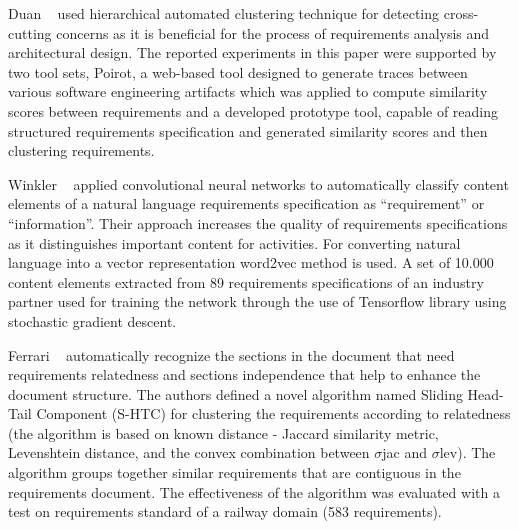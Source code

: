 Duan \etal~\cite{Duan:2007} used hierarchical automated clustering technique for
detecting cross-cutting concerns as it is beneficial for the process of
requirements analysis and architectural design. The reported experiments in this
paper were supported by two tool sets, Poirot, a web-based tool designed to
generate traces between various software engineering artifacts which was applied
to compute similarity scores between requirements and a developed prototype
tool, capable of reading structured requirements specification and generated
similarity scores and then clustering requirements.

Winkler \etal~\cite{Winkler:2016} applied convolutional neural networks to
automatically classify content elements of a natural language requirements
specification as “requirement” or “information”. Their approach increases the quality of requirements
specifications as it distinguishes important content for activities. For
converting natural language into a vector representation word2vec method is
used. A set of 10.000 content elements extracted from 89 requirements
specifications of an industry partner used for training the network through the
use of Tensorflow library using stochastic gradient descent.

 Ferrari \etal~\cite{Ferrari:2013} automatically recognize
the sections in the document that need requirements relatedness and sections
independence that help to enhance the document structure. The authors defined a
novel algorithm named Sliding Head-Tail Component (S-HTC) for clustering the
requirements according to relatedness (the algorithm is based on known distance
- Jaccard similarity metric, Levenshtein distance, and the convex combination
between $\sigma$jac and $\sigma$lev). The algorithm groups together similar
requirements that are contiguous in the requirements document. The effectiveness
of the algorithm was evaluated with a test on requirements standard of a railway
domain (583 requirements).

